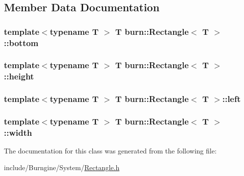 \subsection{Member Data Documentation}
\hypertarget{classburn_1_1_rectangle_ac803117e818b4f8869ee86ae17d55a2f}{
\subsubsection[{bottom}]{\setlength{\rightskip}{0pt plus 5cm}template$<$typename T $>$ T {\bf burn\-::\-Rectangle}$<$ T $>$\-::bottom}}\label{classburn_1_1_rectangle_ac803117e818b4f8869ee86ae17d55a2f}
\hypertarget{classburn_1_1_rectangle_a5ffb1027478b9c1258ea27fee42ee9a3}{
\subsubsection[{height}]{\setlength{\rightskip}{0pt plus 5cm}template$<$typename T $>$ T {\bf burn\-::\-Rectangle}$<$ T $>$\-::height}}\label{classburn_1_1_rectangle_a5ffb1027478b9c1258ea27fee42ee9a3}
\hypertarget{classburn_1_1_rectangle_aae4763b8cc1ac369660dc869b01b4306}{
\subsubsection[{left}]{\setlength{\rightskip}{0pt plus 5cm}template$<$typename T $>$ T {\bf burn\-::\-Rectangle}$<$ T $>$\-::left}}\label{classburn_1_1_rectangle_aae4763b8cc1ac369660dc869b01b4306}
\hypertarget{classburn_1_1_rectangle_a636fd98d979fa5e84a625328f89da0ec}{
\subsubsection[{width}]{\setlength{\rightskip}{0pt plus 5cm}template$<$typename T $>$ T {\bf burn\-::\-Rectangle}$<$ T $>$\-::width}}\label{classburn_1_1_rectangle_a636fd98d979fa5e84a625328f89da0ec}


The documentation for this class was generated from the following file\-:\begin{DoxyCompactItemize}
\item 
include/\-Burngine/\-System/\hyperlink{_rectangle_8h}{Rectangle.\-h}\end{DoxyCompactItemize}
